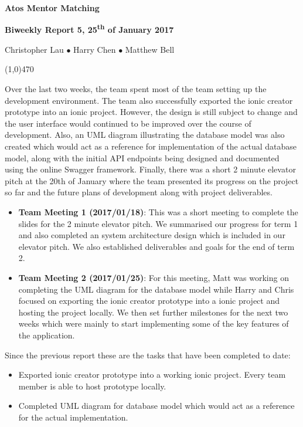 \documentclass[11pt]{report}
\begin{document}
\centerline{{\LARGE \bf Atos Mentor Matching}}

\centerline{\large \bf Biweekly Report 5, 25\textsuperscript{th} of January 2017}
\centerline{Christopher Lau $\bullet$ Harry Chen $\bullet$ Matthew Bell }
\noindent
\line(1,0){470}\\


\smallskip

\noindent
Over the last two weeks, the team spent most of the team setting up the
development environment. The team also successfully exported the ionic creator
prototype into an ionic project. However, the design is still subject to change
and the user interface would continued to be improved over the course of
development. Also, an UML diagram illustrating the database model was also
created which would act as a reference for implementation of the actual database
model, along with the initial API endpoints being designed and documented using
the online Swagger framework. Finally, there was a short 2 minute elevator pitch
at the 20th of January where the team presented its progress on the project so
far and the future plans of development along with project deliverables.

\bigskip
{}
\smallskip

\noindent
\begin{itemize}
    \item \textbf{Team Meeting 1 (2017/01/18)}: This was a short meeting to
        complete the slides for the 2 minute elevator pitch. We summarised our
        progress for term 1 and also completed an system architecture design
        which is included in our elevator pitch. We also established
        deliverables and goals for the end of term 2.
    \item \textbf{Team Meeting 2 (2017/01/25)}: For this meeting, Matt was
        working on completing the UML diagram for the database model while Harry
        and Chris focused on exporting the ionic creator prototype into a ionic
        project and hosting the project locally. We then set further milestones
        for the next two weeks which were mainly to start implementing some of
        the key features of the application.
\end{itemize}

\bigskip
{}
\smallskip

\noindent
Since the previous report these are the tasks that have been completed to date:
\begin{itemize}
    \item Exported ionic creator prototype into a working ionic project. Every
        team member is able to host prototype locally.
    \item Completed UML diagram for database model which would act as a
        reference for the actual implementation.
\end{itemize}
\end{document}
